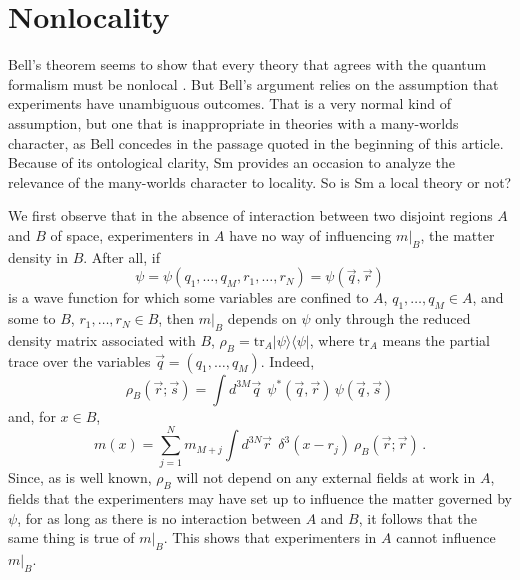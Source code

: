 \documentclass[12pt]{article}
\newcommand{\tr}{\mathrm{tr}}
\newcommand{\n}[1]{{#1}}
\newcommand{\x}[1]{{#1}}
\begin{document}


\section{Nonlocality}\label{sec:locality}

Bell's theorem seems to show that every theory that agrees with the quantum formalism must be nonlocal \cite{Bell64}. But Bell's argument relies on the assumption that experiments have unambiguous outcomes. That is a very normal kind of assumption, but one that is inappropriate in theories with a many-worlds character, as Bell concedes in the passage quoted in the beginning of this article. Because of its ontological clarity, Sm provides an occasion to analyze the relevance of the many-worlds character to locality. So is Sm a local theory or not? 

We first observe that in the absence of interaction between two disjoint regions $A$ and $B$ of space, experimenters in $A$ have no way of influencing $m|_B$, the matter density in $B$. After all, if
\[
\psi=\psi(q_1,\ldots,q_{M},r_1,\ldots,r_{N})=\psi(\vec{q},\vec{r})
\]
is a wave function for which some variables are confined to $A$, $q_1,\ldots,q_{M} \in A$, and some to $B$, $r_1,\ldots, r_{N}\in B$, \n{then} $m|_B$ depends on $\psi$ only through the reduced density matrix associated with $B$, $\rho_B = \tr_A |\psi\rangle \langle \psi|$, where $\tr_A$ means the partial trace over the variables $\vec{q}=(q_1,\ldots,q_{M})$. Indeed, 
\begin{equation}
\rho_B(\vec{r};\vec{s}) = 
\int d^{3M}\vec{q} \:\: \psi^*(\vec{q},\vec{r}) \, \psi(\vec{q},\vec{s})
\end{equation}
and, for $x\in B$,
\begin{equation}\label{mrho}
m(x) = \sum_{j=1}^{N} m_{M+j} \int d^{3N}\vec{r} \:\: \delta^3(x-r_j)\:
\rho_B(\vec{r};\vec{r})\,.
\end{equation}
\n{Since, as is well known, $\rho_B$ will}   not depend on any external fields at work in $A$, fields that the experimenters may have set up to influence the matter governed by $\psi$, \n{for} as long as there is no interaction between $A$ and $B$, \n{it follows that the same thing is true of $m|_B$}. This shows that experimenters in $A$ cannot influence $m|_B$.
\end{document}
